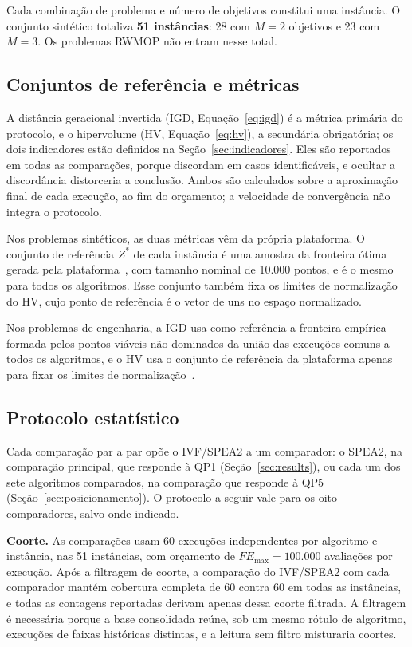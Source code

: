 Cada combinação de problema e número de objetivos constitui uma instância. O conjunto sintético totaliza \textbf{51 instâncias}: 28 com $M = 2$ objetivos e 23 com $M = 3$. Os problemas RWMOP não entram nesse total.

\subsection{Conjuntos de referência e métricas}
\label{sec:metricas}

A distância geracional invertida (IGD, Equação~\ref{eq:igd}) é a métrica primária do protocolo, e o hipervolume (HV, Equação~\ref{eq:hv}), a secundária obrigatória; os dois indicadores estão definidos na Seção~\ref{sec:indicadores}. Eles são reportados em todas as comparações, porque discordam em casos identificáveis, e ocultar a discordância distorceria a conclusão. Ambos são calculados sobre a aproximação final de cada execução, ao fim do orçamento; a velocidade de convergência não integra o protocolo.

Nos problemas sintéticos, as duas métricas vêm da própria plataforma. O conjunto de referência $Z^{*}$ de cada instância é uma amostra da fronteira ótima gerada pela plataforma~\cite{platemo}, com tamanho nominal de 10.000 pontos, e é o mesmo para todos os algoritmos. Esse conjunto também fixa os limites de normalização do HV, cujo ponto de referência é o vetor de uns no espaço normalizado.

Nos problemas de engenharia, a IGD usa como referência a fronteira empírica formada pelos pontos viáveis não dominados da união das execuções comuns a todos os algoritmos, e o HV usa o conjunto de referência da plataforma apenas para fixar os limites de normalização~\cite{zambrano2026ivfspea2}.

\subsection{Protocolo estatístico}
\label{sec:estatistica}

Cada comparação par a par opõe o IVF/SPEA2 a um comparador: o SPEA2, na comparação principal, que responde à QP1 (Seção~\ref{sec:results}), ou cada um dos sete algoritmos comparados, na comparação que responde à QP5 (Seção~\ref{sec:posicionamento}). O protocolo a seguir vale para os oito comparadores, salvo onde indicado.

\textbf{Coorte.} As comparações usam 60 execuções independentes por algoritmo e instância, nas 51 instâncias, com orçamento de $FE_{\max} = 100.000$ avaliações por execução. Após a filtragem de coorte, a comparação do IVF/SPEA2 com cada comparador mantém cobertura completa de 60 contra 60 em todas as instâncias, e todas as contagens reportadas derivam apenas dessa coorte filtrada. A filtragem é necessária porque a base consolidada reúne, sob um mesmo rótulo de algoritmo, execuções de faixas históricas distintas, e a leitura sem filtro misturaria coortes.


